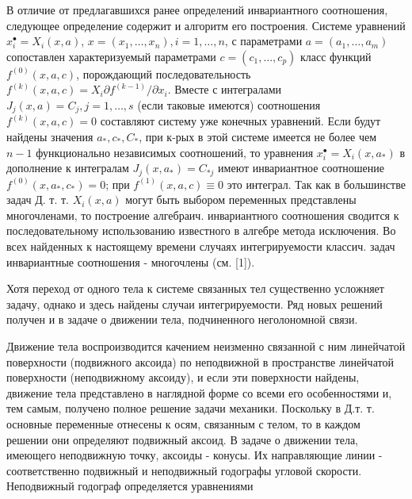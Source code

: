 \documentclass[10pt]{article}
\begin{document}
В отличие от предлагавшихся ранее определений инвариантного соотношения, следующее определение содержит и алгоритм его построения. Системе уравнений $x_{i}^{\bullet}=X_{i}(x, a)$, $x=\left(x_{1}, \ldots, x_{n}\right), i=1, \ldots, n$, с параметрами $a=\left(a_{1}, \ldots, a_{m}\right)$ сопоставлен характеризуемый параметрами $c=\left(c_{1}, \ldots, c_{p}\right)$ класс функций $f^{(0)}(x, a, c)$, порождающий последовательность $f^{(k)}(x, a, c)=X_{i} \partial f^{(k-1)} / \partial x_{i}$. Вместе с интегралами $J_{j}(x, a)=C_{j}, j=1, \ldots, s$ (если таковые имеются) соотношения $f^{(k)}(x, a, c)=0$ составляют систему уже конечных уравнений. Если будут найдены значения $a_{*}, c_{*}, C_{*}$, при к-рых в этой системе имеется не более чем $n-1$ функционально независимых соотношений, то уравнения $x_{i}^{\bullet}=X_{i}\left(x, a_{*}\right)$ в дополнение к интегралам $J_{j}\left(x, a_{*}\right)=C_{* j}$ имеют инвариантное соотношение $f^{(0)}\left(x, a_{*}, c_{*}\right)=0$; при $f^{(1)}(x, a, c) \equiv 0$ это интеграл. Так как в большинстве задач Д. т. т. $X_{i}(x, a)$ могут быть выбором переменных представлены многочленами, то построение алгебраич. инвариантного соотношения сводится к последовательному использованию известного в алгебре метода исключения. Во всех найденных к настоящему времени случаях интегрируемости классич. задач инвариантные соотношения - многочлены (см. [1]).



Хотя переход от одного тела к системе связанных тел существенно усложняет задачу, однако и здесь найдены случаи интегрируемости. Ряд новых решений получен и в задаче о движении тела, подчиненного неголономной связи.



Движение тела воспроизводится качением неизменно связанной с ним линейчатой поверхности (подвижного аксоида) по неподвижной в пространстве линейчатой поверхности (неподвижному аксоиду), и если эти поверхности найдены, движение тела представлено в наглядной форме со всеми его особенностями и, тем самым, получено полное решение задачи механики. Поскольку в Д.т. т. основные переменные отнесены к осям, связанным с телом, то в каждом решении они определяют подвижный аксоид. В задаче о движении тела, имеющего неподвижную точку, аксоиды - конусы. Их направляющие линии - соответственно подвижный и неподвижный годографы угловой скорости. Неподвижный годограф определяется уравнениями
\end{document}
